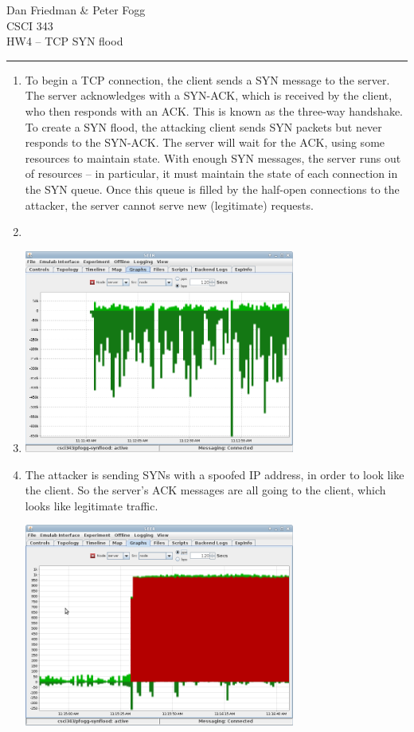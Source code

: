 \documentclass[11pt]{article}
\renewcommand{\maketitle}{
  \begin{center}
    \begin{flushright}
      Dan Friedman \& Peter Fogg \\
      CSCI 343 \\
      HW4 -- TCP SYN flood
    \end{flushright}
    \rule{\linewidth}{0.1mm}
  \end{center}
}
\begin{document}
\maketitle
\begin{enumerate}
\item To begin a TCP connection, the client sends a SYN message to the server. The server acknowledges with a SYN-ACK, which is received by the client, who then responds with an ACK. This is known as the three-way handshake. To create a SYN flood, the attacking client sends SYN packets but never responds to the SYN-ACK. The server will wait for the ACK, using some resources to maintain state. With enough SYN messages, the server runs out of resources -- in particular, it must maintain the state of each connection in the SYN queue. Once this queue is filled by the half-open connections to the attacker, the server cannot serve new (legitimate) requests.
\item
\item \text{}
  \begin{center}
    \includegraphics[width=3.5in]{green-traffic.png}
  \end{center}
\item The attacker is sending SYNs with a spoofed IP address, in order to look like the client. So the server's ACK messages are all going to the client, which looks like legitimate traffic.
  \begin{center}
    \includegraphics[width=3.5in]{red-traffic.png}

\end{center}
\end{enumerate}
\end{document}
